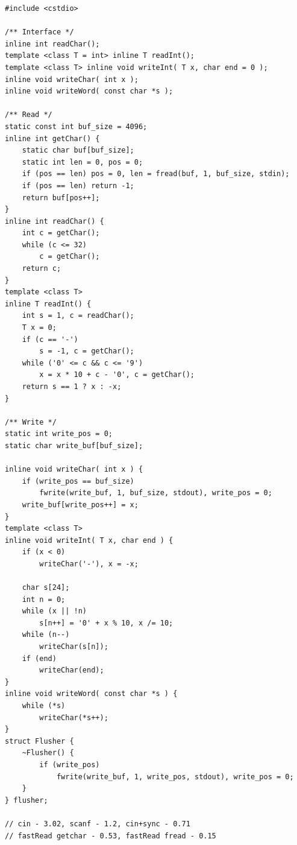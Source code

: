 \documentclass[10pt, portrait,letterpaper]{article}
\begin{document}
\begin{verbatim}
#include <cstdio>

/** Interface */
inline int readChar();
template <class T = int> inline T readInt(); 
template <class T> inline void writeInt( T x, char end = 0 );
inline void writeChar( int x ); 
inline void writeWord( const char *s );

/** Read */
static const int buf_size = 4096;
inline int getChar() {
    static char buf[buf_size];
    static int len = 0, pos = 0;
    if (pos == len) pos = 0, len = fread(buf, 1, buf_size, stdin);
    if (pos == len) return -1;
    return buf[pos++];
}
inline int readChar() {
    int c = getChar();
    while (c <= 32)
        c = getChar();
    return c;
}
template <class T>
inline T readInt() {
    int s = 1, c = readChar();
    T x = 0;
    if (c == '-')
        s = -1, c = getChar();
    while ('0' <= c && c <= '9')
        x = x * 10 + c - '0', c = getChar();
    return s == 1 ? x : -x;
}

/** Write */
static int write_pos = 0;
static char write_buf[buf_size];

inline void writeChar( int x ) {
    if (write_pos == buf_size)
        fwrite(write_buf, 1, buf_size, stdout), write_pos = 0;
    write_buf[write_pos++] = x;
}
template <class T> 
inline void writeInt( T x, char end ) {
    if (x < 0)
        writeChar('-'), x = -x;

    char s[24];
    int n = 0;
    while (x || !n)
        s[n++] = '0' + x % 10, x /= 10;
    while (n--)
        writeChar(s[n]);
    if (end)
        writeChar(end);
}
inline void writeWord( const char *s ) {
    while (*s)
        writeChar(*s++);
}
struct Flusher {
    ~Flusher() {
        if (write_pos)
            fwrite(write_buf, 1, write_pos, stdout), write_pos = 0;
    }
} flusher;

// cin - 3.02, scanf - 1.2, cin+sync - 0.71
// fastRead getchar - 0.53, fastRead fread - 0.15
\end{verbatim}
\end{document}
